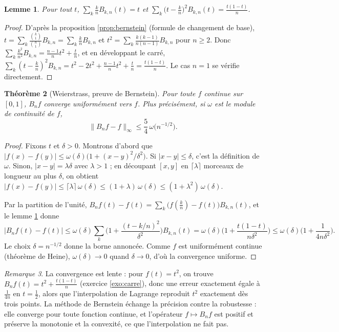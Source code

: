 \documentclass[11pt,a4paper]{article}
\theoremstyle{plain}
\newtheorem{theoreme}{Théorème}[section]
\newtheorem{lemme}[theoreme]{Lemme}
\theoremstyle{definition}
\theoremstyle{remark}
\newtheorem{remarque}[theoreme]{Remarque}
\begin{document}
\begin{lemme}\label{lem:moments}
Pour tout $t$, $\sum_k\frac knB_{k,n}(t)=t$ et $\sum_k\big(t-\frac kn\big)^2B_{k,n}(t)=\frac{t(1-t)}n$.
\end{lemme}

\begin{proof}
D'après la proposition \ref{prop:bernstein} (formule de changement de base), $t=\sum_k\frac{\binom k1}{\binom n1}B_{k,n}=\sum_k\frac knB_{k,n}$ et $t^2=\sum_k\frac{k(k-1)}{n(n-1)}B_{k,n}$ pour $n\geq2$. Donc $\sum_k\frac{k^2}{n^2}B_{k,n}=\frac{n-1}nt^2+\frac tn$, et en développant le carré, $\sum_k(t-\frac kn)^2B_{k,n}=t^2-2t^2+\frac{n-1}nt^2+\frac tn=\frac{t(1-t)}n$. Le cas $n=1$ se vérifie directement.
\end{proof}

\begin{theoreme}[Weierstrass, preuve de Bernstein]\label{thm:weierstrass}
Pour toute $f$ continue sur $[0,1]$, $B_nf$ converge uniformément vers $f$. Plus précisément, si $\omega$ est le module de continuité de $f$,
\[
  \|B_nf-f\|_\infty\leq\frac54\,\omega\big(n^{-1/2}\big) .
\]
\end{theoreme}

\begin{proof}
Fixons $t$ et $\delta>0$. Montrons d'abord que $|f(x)-f(y)|\leq\omega(\delta)\big(1+(x-y)^2/\delta^2\big)$. Si $|x-y|\leq\delta$, c'est la définition de $\omega$. Sinon, $|x-y|=\lambda\delta$ avec $\lambda>1$ ; en découpant $[x,y]$ en $\lceil\lambda\rceil$ morceaux de longueur au plus $\delta$, on obtient $|f(x)-f(y)|\leq\lceil\lambda\rceil\,\omega(\delta)\leq(1+\lambda)\,\omega(\delta)\leq(1+\lambda^2)\,\omega(\delta)$.

Par la partition de l'unité, $B_nf(t)-f(t)=\sum_k\big(f(\frac kn)-f(t)\big)B_{k,n}(t)$, et le lemme \ref{lem:moments} donne
\[
  |B_nf(t)-f(t)|\leq\omega(\delta)\sum_k\Big(1+\frac{(t-k/n)^2}{\delta^2}\Big)B_{k,n}(t)=\omega(\delta)\Big(1+\frac{t(1-t)}{n\delta^2}\Big)\leq\omega(\delta)\Big(1+\frac1{4n\delta^2}\Big) .
\]
Le choix $\delta=n^{-1/2}$ donne la borne annoncée. Comme $f$ est uniformément continue (théorème de Heine), $\omega(\delta)\to0$ quand $\delta\to0$, d'où la convergence uniforme.
\end{proof}

\begin{remarque}
La convergence est lente : pour $f(t)=t^2$, on trouve $B_nf(t)=t^2+\frac{t(1-t)}n$ (exercice \ref{exo:carre}), donc une erreur exactement égale à $\frac1{4n}$ en $t=\frac12$, alors que l'interpolation de Lagrange reproduit $t^2$ exactement dès trois points. La méthode de Bernstein échange la précision contre la robustesse : elle converge pour toute fonction continue, et l'opérateur $f\mapsto B_nf$ est positif et préserve la monotonie et la convexité, ce que l'interpolation ne fait pas.
\end{remarque}
\end{document}
